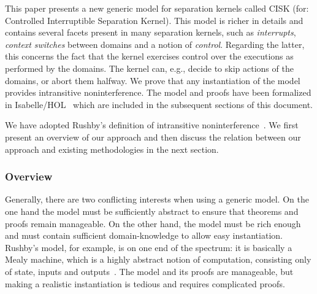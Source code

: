 \documentclass[11pt,a4paper]{article}
\begin{document}
This paper presents a new generic model for separation kernels called CISK 
(for: Controlled Interruptible Separation Kernel). This model is richer in 
details and contains several facets present in many separation kernels, such as 
\emph{interrupts}, \emph{context} \emph{switches} between domains and a notion of 
\emph{control}. Regarding the latter, this concerns the fact that the kernel 
exercises control over the executions as performed by the domains.
The kernel can, e.g., decide to skip actions of the domains, or abort them halfway.
We prove that any instantiation of the model provides intransitive noninterference.
The model and proofs have been formalized in Isabelle/HOL~\cite{nipkow12} 
which are included in the subsequent sections of this document.


We have adopted Rushby's definition of intransitive noninterference~\cite{rushby92}.
We first present an overview of our approach and then discuss the relation between 
our approach and existing methodologies in the next section.


\subsubsection*{Overview}\label{subsec:overview}

Generally, there are two conflicting interests when using a generic model.
On the one hand the model must be sufficiently abstract to ensure that theorems 
and proofs remain manageable. On the other hand, the model must be rich enough 
and must contain sufficient domain-knowledge to allow easy instantiation.
Rushby's model, for example, is on one end of the spectrum: it is basically a 
Mealy machine, which is a highly abstract notion of computation, consisting only 
of state, inputs and outputs~\cite{rushby92}.
The model and its proofs are manageable, but making a realistic instantiation is 
tedious and requires complicated proofs. %
\end{document}
